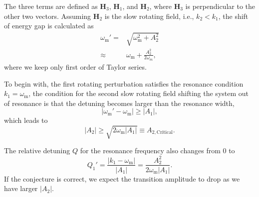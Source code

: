 \documentclass[%
reprint,
 amsmath,amssymb,
 aps,
]{revtex4-1}
\begin{document}
The three terms are defined as $\mathbf  H_3$, $\mathbf H_1$, and $\mathbf H_2$, where $\mathbf H_3$ is perpendicular to the other two vectors. Assuming $\mathbf H_2$ is the slow rotating field, i.e., $k_2<k_1$, the shift of energy gap is calculated as
\begin{align}
    \omega_{\mathrm{m}}' =& \sqrt{\omega_{\mathrm{m}}^2 + A_2^2 } \\
    \approx & \omega_{\mathrm{m}} + \frac{A_2^2}{2\omega_{m}},
\end{align}
where we keep only first order of Taylor series.
    
To begin with, the first rotating perturbation satisfies the resonance condition $k_1=\omega_{\mathrm{m}}$, the condition for the second slow rotating field shifting the system out of resonance is that the detuning becomes larger than the resonance width,
\begin{equation}
\lvert \omega_{\mathrm{m}}' - \omega_{\mathrm{m}} \rvert \geq \lvert A_1 \rvert,
\end{equation}
which leads to
\begin{equation}
\lvert A_2 \rvert \geq \sqrt{2\omega_{\mathrm{m}} \lvert A_1 \rvert} \equiv A_{2,\mathrm{Critical}}.
\end{equation}

The relative detuning $Q$ for the resonance frequency also changes from 0 to
\begin{equation}
    Q_1' = \frac{\lvert k_1 - \omega_{\mathrm{m}} \rvert }{ \lvert A_1 \rvert } = \frac{A_2^2}{2\omega_{\mathrm{m}} \lvert A_1 \rvert }.
    \label{eq-new-q-value-by-adding-new-long-wavelength-mode}
\end{equation}
If the conjecture is correct, we expect the transition amplitude to drop as we have larger $\lvert A_2\rvert$.
\end{document}
